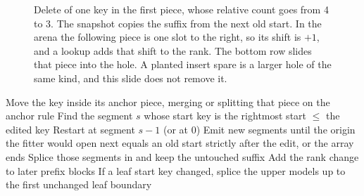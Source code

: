 \documentclass[conference]{IEEEtran}
\begin{document}
\begin{figure}[t]
\centering
{}
\caption{Delete of one key in the first piece, whose relative count goes from 4 to 3.
The snapshot copies the suffix from the next old start.
In the arena the following piece is one slot to the right, so its shift is $+1$, and a lookup adds that shift to the rank.
The bottom row slides that piece into the hole.
A planted insert spare is a larger hole of the same kind, and this slide does not remove it.}
\label{fig:arch}
\end{figure}

\begin{algorithm}[t]
\caption{Local re-fit after one insert or delete.}
\label{alg:refit}
\begin{algorithmic}[1]
\STATE Move the key inside its anchor piece, merging or splitting that piece on the anchor rule
\STATE Find the segment $s$ whose start key is the rightmost start $\le$ the edited key
\STATE Restart at segment $s-1$ (or at $0$)
\STATE Emit new segments until the origin the fitter would open next equals an old start strictly after the edit, or the array ends
\STATE Splice those segments in and keep the untouched suffix
\STATE Add the rank change to later prefix blocks
\STATE If a leaf start key changed, splice the upper models up to the first unchanged leaf boundary
\end{algorithmic}
\end{algorithm}
\end{document}
